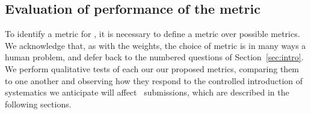 \subsection{Evaluation of performance of the metric}
\label{sec:inception}

To identify a metric for \plasticc, it is necessary to define a metric over possible metrics.
We acknowledge that, as with the weights, the choice of metric is in many ways a human problem, and defer back to the numbered questions of Section~\ref{sec:intro}.
We perform qualitative tests of each our our proposed metrics, comparing them to one another and observing how they respond to the controlled introduction of systematics we anticipate will affect \plasticc\ submissions, which are described in the following sections.
